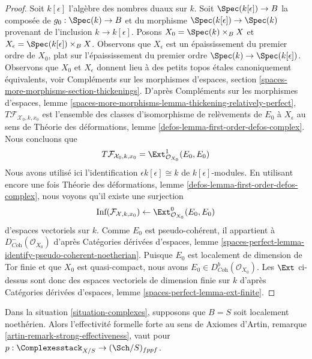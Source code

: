 \begin{proof}
\medskip\noindent
Soit $k[\epsilon]$ l'algèbre des nombres duaux sur $k$.
Soit $\Spec(k[\epsilon]) \to B$ la composée de $g_0 : \Spec(k) \to B$ et du
morphisme $\Spec(k[\epsilon]) \to \Spec(k)$ provenant de l'inclusion
$k \to k[\epsilon]$.
Posons $X_0 = \Spec(k) \times_B X$ et
$X_\epsilon = \Spec(k[\epsilon]) \times_B X$.
Observons que $X_\epsilon$ est un épaississement du premier ordre de $X_0$,
plat sur l'épaississement du premier ordre
$\Spec(k) \to \Spec(k[\epsilon])$.
Observons que $X_0$ et $X_\epsilon$ donnent lieu à des petits topos étales
canoniquement équivalents, voir
Compléments sur les morphismes d'espaces, section
\ref{spaces-more-morphisms-section-thickenings}.
D'après Compléments sur les morphismes d'espaces, lemme
\ref{spaces-more-morphisms-lemma-thickening-relatively-perfect},
$T\mathcal{F}_{\mathcal{X}_0, k, x_0}$ est l'ensemble des classes
d'isomorphisme de relèvements de $E_0$ à $X_\epsilon$ au sens de
Théorie des déformations, lemme
\ref{defos-lemma-first-order-defos-complex}.
Nous concluons que
$$
T\mathcal{F}_{\mathcal{X}_0, k, x_0} =
\Ext^1_{\mathcal{O}_{X_0}}(E_0, E_0)
$$
Nous avons utilisé ici l'identification $\epsilon k[\epsilon] \cong k$ de
$k[\epsilon]$-modules. En utilisant encore une fois
Théorie des déformations, lemme
\ref{defos-lemma-first-order-defos-complex}, nous voyons qu'il existe une
surjection
$$
\text{Inf}(\mathcal{F}_{\mathcal{X}, k, x_0})
\leftarrow
\Ext^0_{\mathcal{O}_{X_0}}(E_0, E_0)
$$
d'espaces vectoriels sur $k$. Comme $E_0$ est pseudo-cohérent, il appartient à
$D^-_{\textit{Coh}}(\mathcal{O}_{X_0})$ d'après
Catégories dérivées d'espaces, lemme
\ref{spaces-perfect-lemma-identify-pseudo-coherent-noetherian}.
Puisque $E_0$ est localement de dimension de Tor finie et que $X_0$ est
quasi-compact, nous avons
$E_0 \in D^b_{\textit{Coh}}(\mathcal{O}_{X_0})$.
Les $\Ext$ ci-dessus sont donc des espaces vectoriels de dimension finie sur
$k$ d'après Catégories dérivées d'espaces, lemme
\ref{spaces-perfect-lemma-ext-finite}.
\end{proof}

\begin{lemma}
\label{lemma-complexes-strong-effectiveness}
Dans la situation \ref{situation-complexes}, supposons que $B = S$ soit
localement noethérien. Alors l'effectivité formelle forte au sens de
Axiomes d'Artin, remarque \ref{artin-remark-strong-effectiveness},
vaut pour $p : \Complexesstack_{X/S} \to (\Sch/S)_{fppf}$.
\end{lemma}

